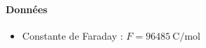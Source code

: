 \paragraph*{Données}
\begin{itemize}
\item Constante de Faraday : $F = 96485 ~ \si{\coulomb\per\mole}$ 
\end{itemize}

